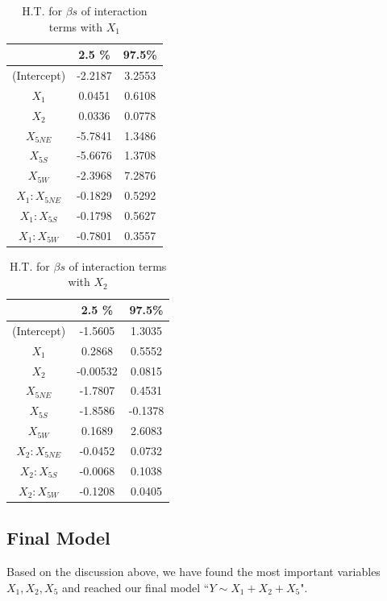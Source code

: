 \documentclass[a4paper,11pt,onecolumn,twoside]{article}
\begin{document}
\begin{table}[H]
	\centering
	\begin{tabular}{ccc}
		\midrule[1.5pt]	
						&2.5 \% &97.5\% \\
		\hline    
		(Intercept) &-2.2187 &3.2553\\
		$X_1$           &0.0451 &0.6108\\
		$X_2$           &0.0336 &0.0778\\
		$X_{5NE}$        &-5.7841 &1.3486\\
		$X_{5S}$         &-5.6676 &1.3708\\
		$X_{5W}$         &-2.3968 &7.2876\\
		$X_1:X_{5NE}$     &-0.1829 &0.5292\\
		$X_1:X_{5S}$      &-0.1798 &0.5627\\
		$X_1:X_{5W}$      &-0.7801 &0.3557\\
		\midrule[1.5pt]
	\end{tabular}
	\caption{H.T. for $\beta s$ of interaction terms with $X_1$ }
\end{table}
\begin{table}[H]
	\centering
	\begin{tabular}{ccc}
		\midrule[1.5pt]	
		&2.5 \% &97.5\% \\
		\hline    
		(Intercept) &-1.5605  &1.3035\\
		$X_1$          &0.2868  &0.5552\\
		$X_2$          &-0.00532  &0.0815\\
		$X_{5NE}$        &-1.7807  &0.4531\\
		$X_{5S}$         &-1.8586 &-0.1378\\
		$X_{5W}$        & 0.1689  &2.6083\\
		$X_2:X_{5NE}$     &-0.0452  &0.0732\\
		$X_2:X_{5S}$      &-0.0068 &0.1038\\
		$X_2:X_{5W}$      &-0.1208  &0.0405\\
		\midrule[1.5pt]
	\end{tabular}
	\caption{H.T. for $\beta s$ of interaction terms with $X_2$ }
\end{table}
\subsection{Final Model}
Based on the discussion above, we have found the most important variables $X_1,X_2,X_5$ and reached our final model ``$Y\sim X_1+X_2+X_5$".
\end{document}
